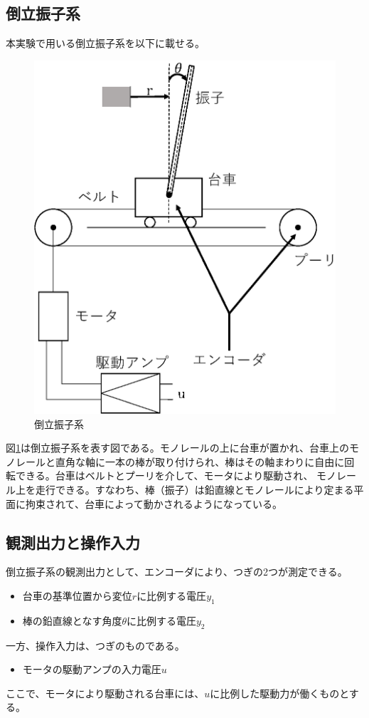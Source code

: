 \subsection{倒立振子系}
本実験で用いる倒立振子系を以下に載せる。\\
\begin{figure}[H]
	\centering
	\includegraphics[width=0.6\linewidth]{gazo/pendulum.eps}
	\caption{倒立振子系}
	\label{image:pendulum}
\end{figure}
図\ref{image:pendulum}は倒立振子系を表す図である。モノレールの上に台車が置かれ、台車上のモノレールと直角な軸に一本の棒が取り付けられ、棒はその軸まわりに自由に回転できる。台車はベルトとプーリを介して、モータにより駆動され、
モノレール上を走行できる。すなわち、棒（振子）は鉛直線とモノレールにより定まる平面に拘束されて、台車によって動かされるようになっている。\\
\subsection{観測出力と操作入力}
倒立振子系の観測出力として、エンコーダにより、つぎの2つが測定できる。\\
\begin{itemize}
  \item 台車の基準位置から変位$r$に比例する電圧$y_{1}$
  \item 棒の鉛直線となす角度$\theta$に比例する電圧$y_{2}$
\end{itemize}
一方、操作入力は、つぎのものである。
\begin{itemize}
  \item モータの駆動アンプの入力電圧$u$
\end{itemize}
ここで、モータにより駆動される台車には、$u$に比例した駆動力が働くものとする。


